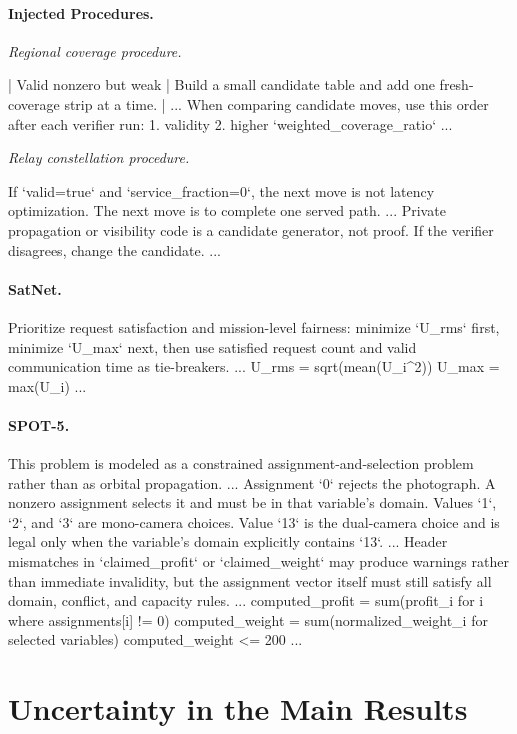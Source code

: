 \documentclass[11pt]{article}
\newenvironment{promptblockcompact}
  {\VerbatimEnvironment\par\smallskip\Needspace{6\baselineskip}\noindent\begin{promptblockinnercompact}}
  {\end{promptblockinnercompact}\par\smallskip}
\newcommand{\promptheadingcompact}[1]{\Needspace{4\baselineskip}\paragraph{#1}\mbox{}\par}
\begin{document}
\promptheadingcompact{Injected Procedures.}
\emph{Regional coverage procedure.}
\begin{promptblockcompact}
| Valid nonzero but weak | Build a small candidate table and add one
fresh-coverage strip at a time. |
...
When comparing candidate moves, use this order after each verifier run:
1. validity
2. higher `weighted_coverage_ratio`
...
\end{promptblockcompact}

\emph{Relay constellation procedure.}
\begin{promptblockcompact}
If `valid=true` and `service_fraction=0`, the next move is not latency
optimization. The next move is to complete one served path.
...
Private propagation or visibility code is a candidate generator, not proof. If
the verifier disagrees, change the candidate.
...
\end{promptblockcompact}

\promptheadingcompact{SatNet.}
\begin{promptblockcompact}
Prioritize request satisfaction and mission-level fairness: minimize `U_rms`
first, minimize `U_max` next, then use satisfied request count and valid
communication time as tie-breakers.
...
U_rms = sqrt(mean(U_i^2))
U_max = max(U_i)
...
\end{promptblockcompact}

\promptheadingcompact{SPOT-5.}
\begin{promptblockcompact}
This problem is modeled as a constrained assignment-and-selection problem
rather than as orbital propagation.
...
Assignment `0` rejects the photograph. A nonzero assignment selects it and
must be in that variable's domain. Values `1`, `2`, and `3` are mono-camera
choices. Value `13` is the dual-camera choice and is legal only when the
variable's domain explicitly contains `13`.
...
Header mismatches in `claimed_profit` or `claimed_weight` may produce warnings
rather than immediate invalidity, but the assignment vector itself must still
satisfy all domain, conflict, and capacity rules.
...
computed_profit = sum(profit_i for i where assignments[i] != 0)
computed_weight = sum(normalized_weight_i for selected variables)
computed_weight <= 200
...
\end{promptblockcompact}

\section{Uncertainty in the Main Results}
\label{app:score-uncertainty}
\end{document}
